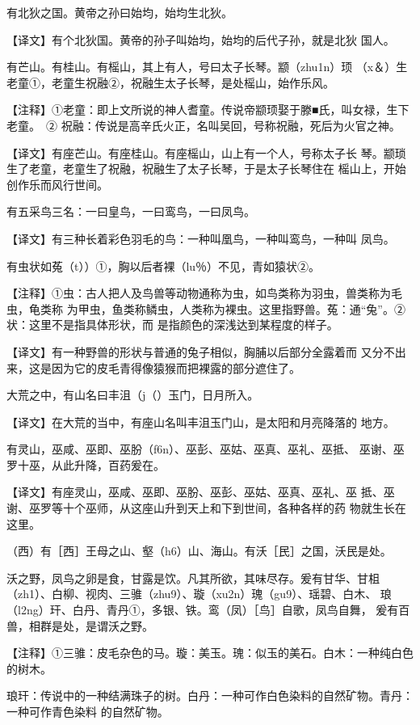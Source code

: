 \documentclass[a4paper,12pt,UTF8,twoside]{ctexbook}
\begin{document}
有北狄之国。黄帝之孙曰始均，始均生北狄。

【译文】有个北狄国。黄帝的孙子叫始均，始均的后代子孙，就是北狄 国人。

有芒山。有桂山。有榣山，其上有人，号曰太子长琴。颛（zhu1n）顼 （x＆）生老童①，老童生祝融②，祝融生太子长琴，是处榣山，始作乐风。

【注释】①老童：即上文所说的神人耆童。传说帝颛顼娶于滕■氏，叫女禄，生下老童。　② 祝融：传说是高辛氏火正，名叫吴回，号称祝融，死后为火官之神。

【译文】有座芒山。有座桂山。有座榣山，山上有一个人，号称太子长 琴。颛琐生了老童，老童生了祝融，祝融生了太子长琴，于是太子长琴住在 榣山上，开始创作乐而风行世间。

有五采鸟三名：一曰皇鸟，一曰鸾鸟，一曰凤鸟。

【译文】有三种长着彩色羽毛的鸟：一种叫凰鸟，一种叫鸾鸟，一种叫 凤鸟。

有虫状如菟（t））①，胸以后者裸（lu％）不见，青如猿状②。

【注释】①虫：古人把人及鸟兽等动物通称为虫，如鸟类称为羽虫，兽类称为毛虫，龟类称 为甲虫，鱼类称鳞虫，人类称为裸虫。这里指野兽。菟：通“兔”。②状：这里不是指具体形状，而 是指颜色的深浅达到某程度的样子。

【译文】有一种野兽的形状与普通的兔子相似，胸脯以后部分全露着而 又分不出来，这是因为它的皮毛青得像猿猴而把裸露的部分遮住了。

大荒之中，有山名曰丰沮（j（）玉门，日月所入。

【译文】在大荒的当中，有座山名叫丰沮玉门山，是太阳和月亮降落的 地方。

有灵山，巫咸、巫即、巫朌（f6n）、巫彭、巫姑、巫真、巫礼、巫抵、 巫谢、巫罗十巫，从此升降，百药爰在。

【译文】有座灵山，巫咸、巫即、巫朌、巫彭、巫姑、巫真、巫礼、巫 抵、巫谢、巫罗等十个巫师，从这座山升到天上和下到世间，各种各样的药 物就生长在这里。

（西）有［西］王母之山、壑（h6）山、海山。有沃［民］之国，沃民是处。

沃之野，凤鸟之卵是食，甘露是饮。凡其所欲，其味尽存。爰有甘华、甘柤 （zh1）、白柳、视肉、三骓（zhu9）、璇（xu2n）瑰（gu9）、瑶碧、白木、 琅（l2ng）玕、白丹、青丹①，多银、铁。鸾（凤）［鸟］自歌，凤鸟自舞， 爰有百兽，相群是处，是谓沃之野。

【注释】①三骓：皮毛杂色的马。璇：美玉。瑰：似玉的美石。白木：一种纯白色的树木。

琅玕：传说中的一种结满珠子的树。白丹：一种可作白色染料的自然矿物。青丹：一种可作青色染料 的自然矿物。
\end{document}
